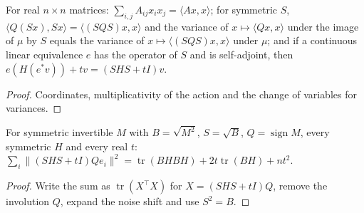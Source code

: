 \begin{lemma}
  \label{lem:quadratic-action-identities}
  \leanok
  For real $n\times n$ matrices: $\sum_{i,j}A_{ij}x_ix_j=\langle Ax,x\rangle$; for symmetric $S$,
  $\langle Q(Sx),Sx\rangle=\langle(SQS)x,x\rangle$ and the variance of $x\mapsto\langle Qx,x\rangle$ under the image of $\mu$
  by $S$ equals the variance of $x\mapsto\langle(SQS)x,x\rangle$ under $\mu$; and if a continuous linear equivalence $e$ has
  the operator of $S$ and is self-adjoint, then $e(H(e^{*}v))+tv=(SHS+tI)v$.
\end{lemma}
\begin{proof}
  \leanok
  Coordinates, multiplicativity of the action and the change of variables for variances.
\end{proof}

\begin{lemma}
  \label{lem:spectral-sign-noise-identity}
  \leanok
  For symmetric invertible $M$ with $B=\sqrt{M^2}$, $S=\sqrt B$, $Q=\operatorname{sign}M$, every symmetric $H$ and every real
  $t$:
  $\sum_i\|(SHS+tI)Qe_i\|^2=\operatorname{tr}(BHBH)+2t\operatorname{tr}(BH)+nt^2$.
\end{lemma}
\begin{proof}
  \leanok
  Write the sum as $\operatorname{tr}(X^{\top}X)$ for $X=(SHS+tI)Q$, remove the involution $Q$, expand the noise shift and
  use $S^2=B$.
\end{proof}

